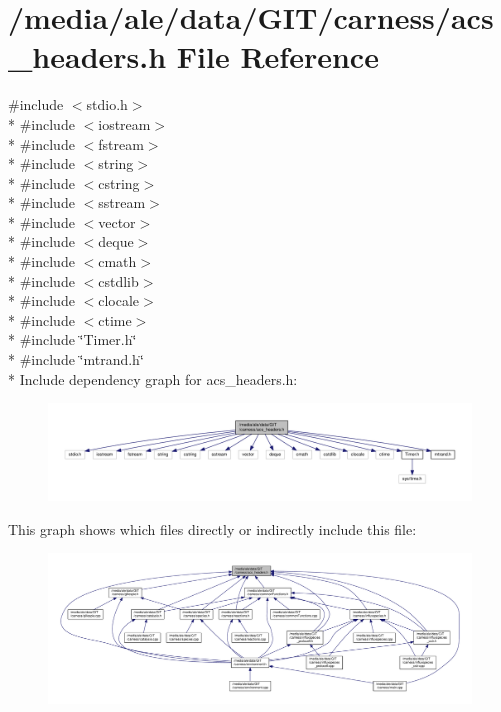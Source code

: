 \hypertarget{a00024}{\section{/media/ale/data/\-G\-I\-T/carness/acs\-\_\-headers.h File Reference}
\label{a00024}
}
{\ttfamily \#include $<$stdio.\-h$>$}\\*
{\ttfamily \#include $<$iostream$>$}\\*
{\ttfamily \#include $<$fstream$>$}\\*
{\ttfamily \#include $<$string$>$}\\*
{\ttfamily \#include $<$cstring$>$}\\*
{\ttfamily \#include $<$sstream$>$}\\*
{\ttfamily \#include $<$vector$>$}\\*
{\ttfamily \#include $<$deque$>$}\\*
{\ttfamily \#include $<$cmath$>$}\\*
{\ttfamily \#include $<$cstdlib$>$}\\*
{\ttfamily \#include $<$clocale$>$}\\*
{\ttfamily \#include $<$ctime$>$}\\*
{\ttfamily \#include \char`\"{}Timer.\-h\char`\"{}}\\*
{\ttfamily \#include \char`\"{}mtrand.\-h\char`\"{}}\\*
Include dependency graph for acs\-\_\-headers.\-h\-:\nopagebreak
\begin{figure}[H]
\begin{center}
\leavevmode
\includegraphics[width=350pt]{a00050}
\end{center}
\end{figure}
This graph shows which files directly or indirectly include this file\-:\nopagebreak
\begin{figure}[H]
\begin{center}
\leavevmode
\includegraphics[width=350pt]{a00051}
\end{center}
\end{figure}
